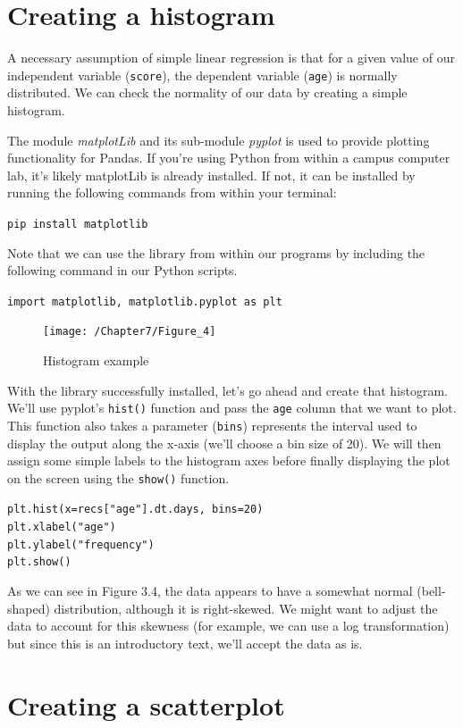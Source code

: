 \documentclass{book}
\begin{document}
\section{Creating a histogram}

A necessary assumption of simple linear regression is that for a given value of our independent variable (\texttt{score}), the dependent variable (\texttt{age}) is normally distributed. We can check the normality of our data by creating a simple histogram.

The module \textit{matplotLib} and its sub-module \textit{pyplot} is used to provide plotting functionality for Pandas. If you're using Python from within a campus computer lab, it's likely matplotLib is already installed. If not, it can be installed by running the following commands from within your terminal:

\texttt{pip install matplotlib}

Note that we can use the library from within our programs by including the following command in our Python scripts.

\texttt{import matplotlib, matplotlib.pyplot as plt}

\begin{figure}[h]
	\caption{Histogram example}
	\centering\texttt{[image: /Chapter7/Figure\_4]}
\end{figure}

With the library successfully installed, let's go ahead and create that histogram. We'll use pyplot's \texttt{hist()} function and pass the \texttt{age} column that we want to plot. This function also takes a parameter (\texttt{bins}) represents the interval used to display the output along the x-axis (we'll choose a bin size of 20). We will then assign some simple labels to the histogram axes before finally displaying the plot on the screen using the \texttt{show()} function.

\texttt{plt.hist(x=recs["age"].dt.days, bins=20) \\
plt.xlabel("age") \\
plt.ylabel("frequency") \\
plt.show()}

As we can see in Figure 3.4, the data appears to have a somewhat normal (bell-shaped) distribution, although it is right-skewed. We might want to adjust the data to account for this skewness (for example, we can use a log transformation) but since this is an introductory text, we'll accept the data as is. 

\section{Creating a scatterplot}
\end{document}
